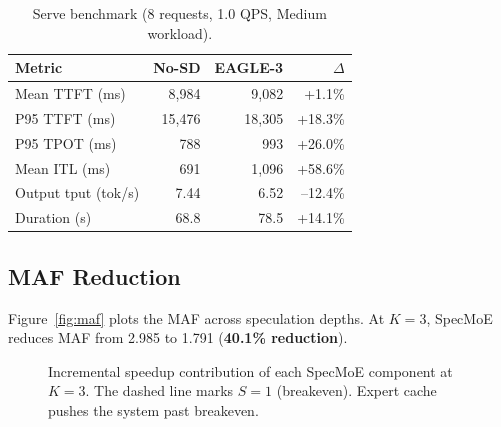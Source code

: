 \documentclass[letterpaper,twocolumn,10pt]{article}
\newcommand{\sysname}{SpecMoE\xspace}
\newcommand{\maf}{MAF\xspace}
\begin{document}
\begin{table}[t]
\centering
\small
\caption{Serve benchmark (8 requests, 1.0 QPS, Medium workload).}\label{tab:e2e-serve}
\begin{tabular}{lrrr}
\toprule
\textbf{Metric} & \textbf{No-SD} & \textbf{EAGLE-3} & \textbf{$\Delta$} \\
\midrule
Mean TTFT (ms)          & 8{,}984  & 9{,}082  & +1.1\% \\
P95 TTFT (ms)           & 15{,}476 & 18{,}305 & +18.3\% \\
P95 TPOT (ms)           & 788      & 993      & +26.0\% \\
Mean ITL (ms)           & 691      & 1{,}096  & +58.6\% \\
Output tput (tok/s)     & 7.44     & 6.52     & --12.4\% \\
Duration (s)            & 68.8     & 78.5     & +14.1\% \\
\bottomrule
\end{tabular}
\end{table}

\subsection{MAF Reduction}

Figure~\ref{fig:maf} plots the \maf across speculation depths.  At
$K\!=\!3$, \sysname reduces \maf from 2.985 to 1.791
(\textbf{40.1\% reduction}).

\begin{figure}[t]
\centering
{}
\caption{Incremental speedup contribution of each \sysname component
  at $K\!=\!3$.  The dashed line marks $S\!=\!1$ (breakeven).  Expert
  cache pushes the system past breakeven.}\label{fig:ablation}
\end{figure}
\end{document}
